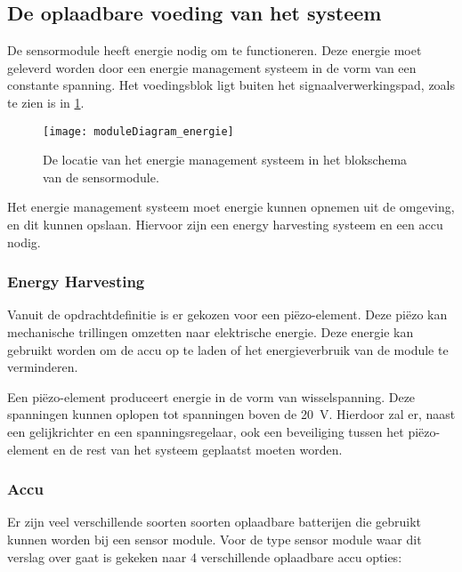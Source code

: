 

\subsection{De oplaadbare voeding van het systeem} \label{sec:energy}

De sensormodule heeft energie nodig om te functioneren. Deze energie moet geleverd worden door een energie management systeem in de vorm van een constante spanning. Het voedingsblok ligt buiten het signaalverwerkingspad, zoals te zien is in \cref{fig:moduleDiagram_energie}.

\begin{figure}[!htb]
    \centering
    \texttt{[image: moduleDiagram\_energie]}
    \caption{De locatie van het energie management systeem in het blokschema van de sensormodule.}
    \label{fig:moduleDiagram_energie}
\end{figure}

Het energie management systeem moet energie kunnen opnemen uit de omgeving, en dit kunnen opslaan. Hiervoor zijn een energy harvesting systeem en een accu nodig.

\subsubsection{Energy Harvesting} \label{sec:harvesting}

Vanuit de opdrachtdefinitie is er gekozen voor een piëzo-element. Deze piëzo kan mechanische trillingen omzetten naar elektrische energie. Deze energie kan gebruikt worden om de accu op te laden of het energieverbruik van de module te verminderen.

Een piëzo-element produceert energie in de vorm van wisselspanning. Deze spanningen kunnen oplopen tot spanningen boven de \qty{20}{\volt}.%
Hierdoor zal er, naast een gelijkrichter en een spanningsregelaar, ook een beveiliging tussen het piëzo-element en de rest van het systeem geplaatst moeten worden.


\subsubsection{Accu} \label{sec:batterijOntwerp}
Er zijn veel verschillende soorten soorten oplaadbare batterijen die gebruikt kunnen worden bij een sensor module.
Voor de type sensor module waar dit verslag over gaat is gekeken naar 4 verschillende oplaadbare accu opties\cite{battery-comparison}:

